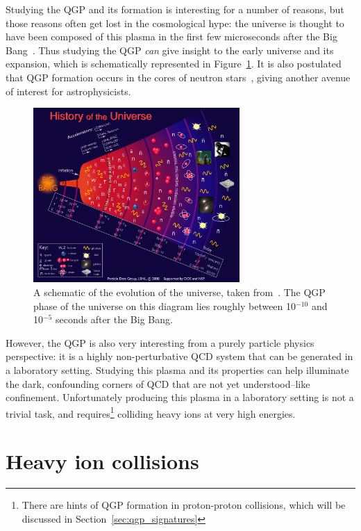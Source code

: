Studying the QGP and its formation is interesting for a number of reasons, but those reasons often get lost in the cosmological hype: the universe is thought to have been composed of this plasma in the first few microseconds after the Big Bang~\cite{QGP3}. Thus studying the QGP \textit{can} give insight to the early universe and its expansion, which is schematically represented in Figure~\ref{fig:qgp_universe}. It is also postulated that QGP formation occurs in the cores of neutron stars~\cite{QGPNeutron}, giving another avenue of interest for astrophysicists.

\begin{figure}
    \centering
    \includegraphics[width=0.7\textwidth]{figures/introduction/qgp_universe.jpg}
    \caption{A schematic of the evolution of the universe, taken from~\cite{QGPUniverse}. The QGP phase of the universe on this diagram lies roughly between 10$^{-10}$ and 10$^{-5}$ seconds after the Big Bang.}
    \label{fig:qgp_universe}
\end{figure}

However, the QGP is also very interesting from a purely particle physics perspective: it is a highly non-perturbative QCD system that can be generated in a laboratory setting. Studying this plasma and its properties can help illuminate the dark, confounding corners of QCD that are not yet understood--like confinement. Unfortunately producing this plasma in a laboratory setting is not a trivial task, and requires\footnote{There are hints of QGP formation in proton-proton collisions, which will be discussed in Section~\ref{sec:qgp_signatures}} colliding heavy ions at very high energies.


\section{Heavy ion collisions}
\label{sec:heavy_ion_collisions}

